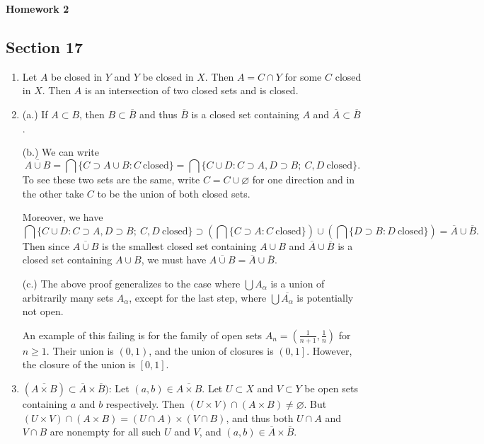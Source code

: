 \documentclass[11pt, reqno]{article}
\theoremstyle{plain}
\theoremstyle{definition}
\theoremstyle{remark}
\renewcommand{\emptyset}{\varnothing}
\begin{document}
\topmargin=-40pt
\renewcommand{\headrulewidth}{1pt}
\renewcommand{\headsep}{20pt}
\thispagestyle{fancy}

{\Huge \bfseries \noindent Homework 2}

\subsection*{Section 17}

\begin{enumerate}
    \item[2.] Let $A$ be closed in $Y$ and $Y$ be closed in $X$. Then $A = C \cap Y$ for 
    some $C$ closed in $X$. Then $A$ is an intersection of two closed sets and is closed. 

    \item[6.] (a.) If $A \subset B$, then $B \subset \overline{B}$ and thus $\overline{B}$
    is a closed set containing $A$ and $\overline{A} \subset \overline{B}$.

    (b.) We can write 
    \[
        \overline{A \cup B} = \bigcap\{C \supset A \cup B: C\ \text{closed}\} 
        = \bigcap\{C\cup D: C \supset A, D \supset B;\ C, D\ \text{closed}\}.
    \]
    To see these two sets are the same, write $C = C \cup \emptyset$ for one direction
    and in the other take $C$ to be the union of both closed sets. 

    Moreover, we have 
    \[
        \bigcap\{C\cup D: C \supset A, D \supset B;\ C, D\ \text{closed}\}
        \supset \left(\bigcap\{C \supset A: C\ \text{closed}\}\right) \cup
        \left(\bigcap\{D \supset B: D\ \text{closed}\}\right) = \overline{A} \cup \overline{B}.
    \]
    Then since $\overline{A \cup B}$ is the smallest closed set containing $A \cup B$ and
    $\overline{A} \cup \overline{B}$ is a closed set containing $A \cup B$, we must have 
    $\overline{A \cup B} = \overline{A} \cup \overline{B}$.

    (c.) The above proof generalizes to the case where $\bigcup A_\alpha$ is a union of
    arbitrarily many sets $A_\alpha$, except for the last step, where $\bigcup \overline{A_\alpha}$
    is potentially not open. 

    An example of this failing is for the family of open sets $A_n = (\frac{1}{n+1}, \frac{1}{n})$
    for $n \geq 1$. Their union is $(0,1)$, and the union of closures is $\left(0,1\right]$.
    However, the closure of the union is $[0,1]$.

    \item[9.] $(\overline{A \times B}) \subset \overline{A} \times \overline{B})$: 
    Let $(a, b) \in \overline{A \times B}$. Let $U \subset X$ and $V \subset Y$ be open sets
    containing $a$ and $b$ respectively.
    Then $(U \times V) \cap (A \times B) \neq \emptyset$. But 
    $(U \times V) \cap (A \times B) = (U \cap A) \times (V \cap B)$, and thus 
    both $U \cap A$ and $V \cap B$ are nonempty for all such $U$ and $V$, and $(a,b) \in \overline{A}\times\overline{B}$.


\end{enumerate}
\end{document}

